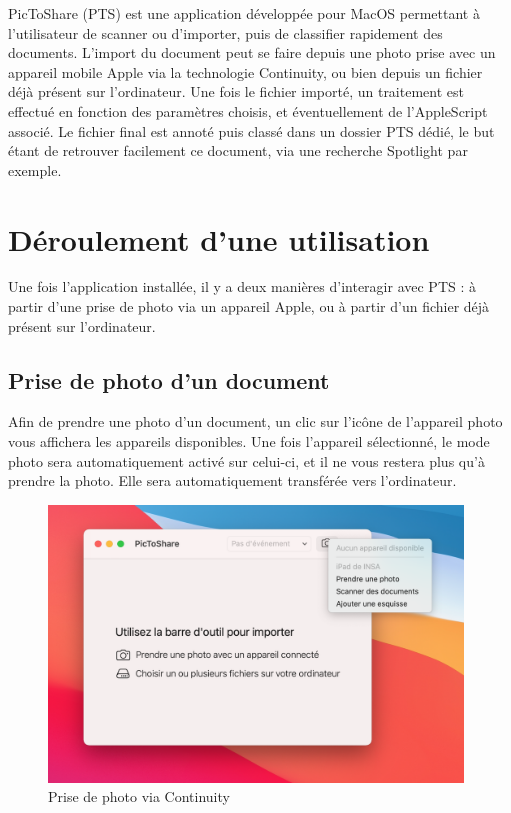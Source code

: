 \documentclass[a4paper,11pt]{article}
\begin{document}
	PicToShare (PTS) est une application développée pour MacOS permettant à l'utilisateur de scanner ou d'importer, puis de classifier rapidement des documents. L'import du document peut se faire depuis une photo prise avec un appareil mobile Apple via la technologie Continuity, ou bien depuis un fichier déjà présent sur l'ordinateur. Une fois le fichier importé, un traitement est effectué en fonction des paramètres choisis, et éventuellement de l'AppleScript associé. Le fichier final est annoté puis classé dans un dossier PTS dédié, le but étant de retrouver facilement ce document, via une recherche Spotlight par exemple.


	\section{Déroulement d'une utilisation}

	Une fois l'application installée, il y a deux manières d'interagir avec PTS : à partir d'une prise de photo via un appareil Apple, ou à partir d'un fichier déjà présent sur l'ordinateur.

	\subsection{Prise de photo d'un document}

	Afin de prendre une photo d'un document, un clic sur l'icône de l'appareil photo vous affichera les appareils disponibles. Une fois l'appareil sélectionné, le mode photo sera automatiquement activé sur celui-ci, et il ne vous restera plus qu'à prendre la photo. Elle sera automatiquement transférée vers l'ordinateur.
		\begin{figure}[h!]
			\centering
			\includegraphics[width=11cm]{Continuity}
			\caption{Prise de photo via Continuity}
		\end{figure}
\end{document}
